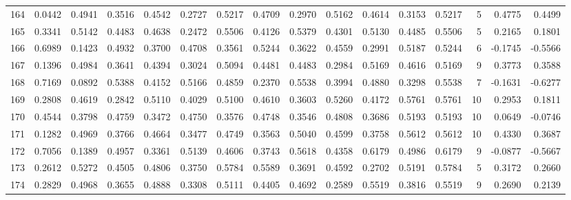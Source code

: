 \begin{tabular}{lrrrrrrrrrrrrrrr}
164 &      0.0442 &  0.4941 &  0.3516 &  0.4542 &  0.2727 &  0.5217 &  0.4709 &  0.2970 &  0.5162 &  0.4614 &   0.3153 &     0.5217 &      5 &                    0.4775 &                     0.4499 \\
165 &      0.3341 &  0.5142 &  0.4483 &  0.4638 &  0.2472 &  0.5506 &  0.4126 &  0.5379 &  0.4301 &  0.5130 &   0.4485 &     0.5506 &      5 &                    0.2165 &                     0.1801 \\
166 &      0.6989 &  0.1423 &  0.4932 &  0.3700 &  0.4708 &  0.3561 &  0.5244 &  0.3622 &  0.4559 &  0.2991 &   0.5187 &     0.5244 &      6 &                   -0.1745 &                    -0.5566 \\
167 &      0.1396 &  0.4984 &  0.3641 &  0.4394 &  0.3024 &  0.5094 &  0.4481 &  0.4483 &  0.2984 &  0.5169 &   0.4616 &     0.5169 &      9 &                    0.3773 &                     0.3588 \\
168 &      0.7169 &  0.0892 &  0.5388 &  0.4152 &  0.5166 &  0.4859 &  0.2370 &  0.5538 &  0.3994 &  0.4880 &   0.3298 &     0.5538 &      7 &                   -0.1631 &                    -0.6277 \\
169 &      0.2808 &  0.4619 &  0.2842 &  0.5110 &  0.4029 &  0.5100 &  0.4610 &  0.3603 &  0.5260 &  0.4172 &   0.5761 &     0.5761 &     10 &                    0.2953 &                     0.1811 \\
170 &      0.4544 &  0.3798 &  0.4759 &  0.3472 &  0.4750 &  0.3576 &  0.4748 &  0.3546 &  0.4808 &  0.3686 &   0.5193 &     0.5193 &     10 &                    0.0649 &                    -0.0746 \\
171 &      0.1282 &  0.4969 &  0.3766 &  0.4664 &  0.3477 &  0.4749 &  0.3563 &  0.5040 &  0.4599 &  0.3758 &   0.5612 &     0.5612 &     10 &                    0.4330 &                     0.3687 \\
172 &      0.7056 &  0.1389 &  0.4957 &  0.3361 &  0.5139 &  0.4606 &  0.3743 &  0.5618 &  0.4358 &  0.6179 &   0.4986 &     0.6179 &      9 &                   -0.0877 &                    -0.5667 \\
173 &      0.2612 &  0.5272 &  0.4505 &  0.4806 &  0.3750 &  0.5784 &  0.5589 &  0.3691 &  0.4592 &  0.2702 &   0.5191 &     0.5784 &      5 &                    0.3172 &                     0.2660 \\
174 &      0.2829 &  0.4968 &  0.3655 &  0.4888 &  0.3308 &  0.5111 &  0.4405 &  0.4692 &  0.2589 &  0.5519 &   0.3816 &     0.5519 &      9 &                    0.2690 &                     0.2139 \\

\end{tabular}
